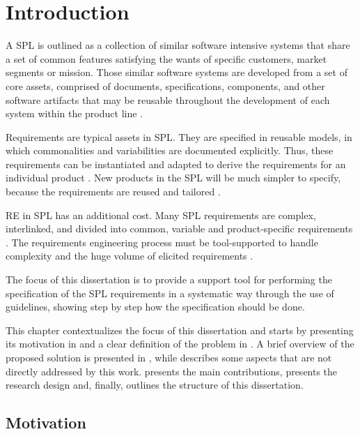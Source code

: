 \chapter{Introduction}
\label{ch:introduction} 
A \acf{SPL} is outlined as a collection of similar software intensive systems
that share a set of common features satisfying the wants of specific customers, market segments 
or mission. Those similar software systems are developed from a set of core assets, comprised of 
documents, specifications, components, and other software artifacts that may be reusable throughout 
the development of each system within the product line
\citep{rafael2013systems}.

Requirements are typical assets in \ac{SPL}. They are specified in reusable models,
in which commonalities and variabilities are documented explicitly. Thus, these 
requirements can be instantiated and adapted to derive the requirements for an 
individual product \citep{cheng2007research}. New products in the SPL will be
much simpler to specify, because the requirements are reused and tailored
\citep{clements2002software}.

\acf{RE} in \ac{SPL} has an additional cost. Many \ac{SPL} requirements are
complex, interlinked, and divided into common, variable and product-specific requirements 
\citep{birk2003report,de2014defining}.  The requirements engineering process
must be tool-supported to handle complexity and the huge volume of elicited requirements
\citep{birk2003report}.

The focus of this dissertation is to provide a support tool for performing the specification of the 
\ac{SPL} requirements in a systematic way through the use of guidelines,  showing step by step how the 
specification should be done.

This chapter contextualizes the focus of this dissertation and starts by
presenting its motivation in  and a clear definition of the problem in 
. A brief overview of the proposed solution is presented in
, while  describes some aspects that
are not directly addressed by this work.
 presents the main contributions,  
 presents the research design  and, finally,
 outlines the structure of this dissertation.

\section{Motivation}
\label{sc:motivation}


